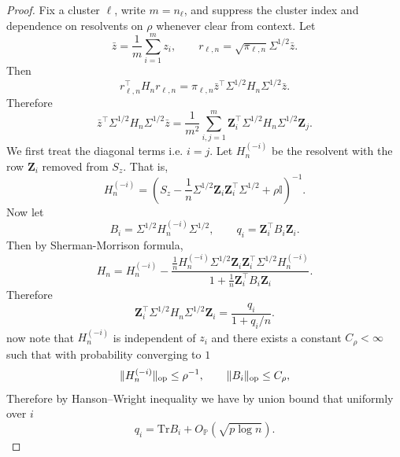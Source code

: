 \documentclass{article}
\theoremstyle{plain}
\theoremstyle{remark}
\def \bZ{\mathbf{Z}}
\def \tr {\mathrm{Tr}}
\def \I{\mathcal{I}}
\def \P{\mathbb{P}}
\def \bZ {{\boldsymbol{Z}}}
\def \I {\mathbb{I}}
\begin{document}
\begin{proof}
    Fix a cluster \(\ell\), write \(m=n_\ell\), and suppress the cluster index and dependence on resolvents on $\rho$ whenever clear from context. Let
\[
\bar z=\frac1m\sum_{i=1}^m z_i,
\qquad
r_{\ell,n}
=
\sqrt{\pi_{\ell,n}}\Sigma^{1/2}\bar z.
\]
Then
\[
r_{\ell,n}^\top H_n r_{\ell,n}
=
\pi_{\ell,n}
\bar z^\top
\Sigma^{1/2}H_n\Sigma^{1/2}
\bar z.
\]
Therefore
\[
\bar z^\top
\Sigma^{1/2}H_n\Sigma^{1/2}
\bar z
=
\frac1{m^2}
\sum_{i,j=1}^m
\bZ_i^\top
\Sigma^{1/2}H_n\Sigma^{1/2}
\bZ_j.
\]
We first treat the diagonal terms i.e. $i=j$. Let \(H_n^{(-i)}\) be the resolvent with the row \(\bZ_i\) removed from \(S_z\). That is,
\[
H_n^{(-i)}
=
\left(
S_z-\frac1n\Sigma^{1/2}\bZ_i\bZ_i^\top\Sigma^{1/2}
+\rho \I
\right)^{-1}.
\]
Now let
\[
B_i=\Sigma^{1/2}H_n^{(-i)}\Sigma^{1/2},
\qquad
q_i=\bZ_i^\top B_i \bZ_i.
\]
Then by Sherman-Morrison formula,
\[
H_n
=
H_n^{(-i)}
-
\frac{
\frac1nH_n^{(-i)}
\Sigma^{1/2}\bZ_i\bZ_i^\top\Sigma^{1/2}
H_n^{(-i)}
}{
1+\frac1n \bZ_i^\top B_i \bZ_i
}.
\]
Therefore
\[
\bZ_i^\top\Sigma^{1/2}H_n\Sigma^{1/2}\bZ_i
=
\frac{q_i}{1+q_i/n}.
\]
now note that \(H_n^{(-i)}\) is independent of \(z_i\) and there exists a constant $C_{\rho}<\infty$ such that with probability converging to $1$ \citep{bai2010spectral}
\[
\|H_n^{(-i)}\|_{\rm op}\le \rho^{-1},
\qquad
\|B_i\|_{\rm op}\le C_\rho,
\]
Therefore by Hanson--Wright inequality we have by union bound that uniformly over \(i\) 
\[
q_i
=
\tr B_i
+
O_{\P}(\sqrt{p\log n}).
\]


\end{proof}
\end{document}
